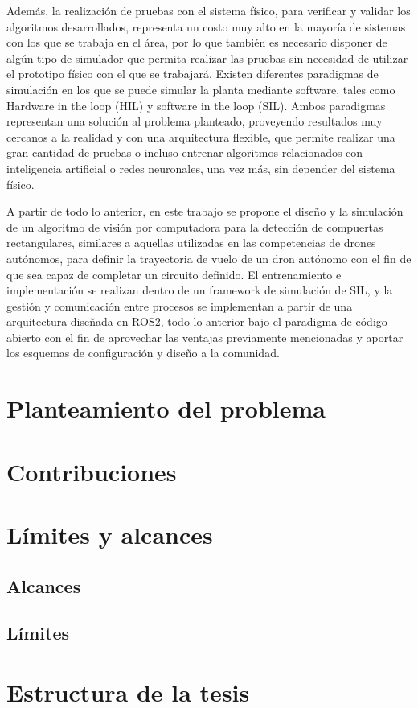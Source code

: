 Además, la realización de pruebas con el sistema físico, para verificar y validar los algoritmos desarrollados, representa un costo muy alto en la mayoría de sistemas con los que se trabaja en el área, por lo que también es necesario disponer de algún tipo de simulador que permita realizar las pruebas sin necesidad de utilizar el prototipo físico con el que se trabajará. Existen diferentes paradigmas de simulación en los que se puede simular la planta mediante software, tales como Hardware in the loop (HIL) y software in the loop (SIL). Ambos paradigmas representan una solución al problema planteado, proveyendo resultados muy cercanos a la realidad y con una arquitectura flexible, que permite realizar una gran cantidad de pruebas o incluso entrenar algoritmos relacionados con inteligencia artificial o redes neuronales, una vez más, sin depender del sistema físico. 

A partir de todo lo anterior, en este trabajo se propone el diseño y la simulación de un algoritmo de visión por computadora para la detección de compuertas rectangulares, similares a aquellas utilizadas en las competencias de drones autónomos, para definir la trayectoria de vuelo de un dron autónomo con el fin de que sea capaz de completar un circuito definido.  El entrenamiento e implementación se realizan dentro de un framework de simulación de SIL, y la gestión y comunicación entre procesos se implementan a partir de una arquitectura diseñada en ROS2, todo lo anterior bajo el paradigma de código abierto con el fin de aprovechar las ventajas previamente mencionadas y aportar los esquemas de configuración y diseño a la comunidad.

\vfill

\section{Planteamiento del problema}


 \section{Contribuciones}


\section{Límites y alcances}

\subsection{Alcances}


\subsection{Límites}



\section{Estructura de la tesis}






